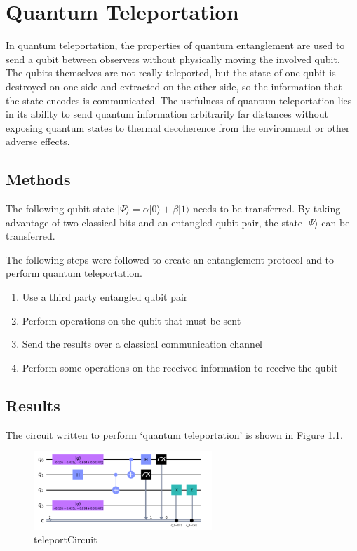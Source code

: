 \renewcommand{\chaptername}{March 15th: Lab}
\chapter{Quantum Teleportation}
In quantum teleportation, the properties of quantum entanglement are used to send a qubit between observers without physically moving the involved qubit. The qubits themselves are not really teleported, but the state of one qubit is destroyed on one side and extracted on the other side, so the information that the state encodes is communicated. The usefulness of quantum teleportation lies in its ability to send quantum information arbitrarily far distances without exposing quantum states to thermal decoherence from the environment or other adverse effects.

\section{Methods}

The following qubit state  $|\Psi \rangle = \alpha |0 \rangle + \beta |1 \rangle$ needs to be transferred. By taking advantage of two classical bits and an entangled qubit pair, the state $|\Psi \rangle$ can be transferred.

The following steps were followed to create an entanglement protocol and to perform quantum teleportation.

\begin{enumerate}
    \item Use a third party entangled qubit pair
    \item Perform operations on the qubit that must be sent
    \item Send the results over a classical communication channel
    \item Perform some operations on the received information to receive the qubit
\end{enumerate}

\section{Results}

The circuit written to perform `quantum teleportation' is shown in Figure \ref{fig:teleportCircuit}.
\begin{figure}[h]
    \centering
    \includegraphics[width=0.6\textwidth]{lab3/images/teleportCircuit.png}
    \caption{teleportCircuit}
    \label{fig:teleportCircuit}
\end{figure}

